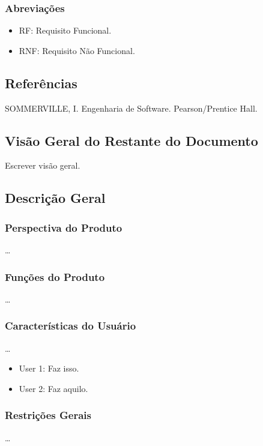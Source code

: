	\subsubsection{Abreviações}
	\begin{itemize}
	\item[] RF: Requisito Funcional.
	\item[] RNF: Requisito Não Funcional.
	\end{itemize}



\subsection{Referências}
SOMMERVILLE, I. Engenharia de Software. Pearson/Prentice Hall.



\subsection{Visão Geral do Restante do Documento}
Escrever visão geral.



\subsection{Descrição Geral}

	\subsubsection{Perspectiva do Produto}
	\ldots
	
	\subsubsection{Funções do Produto}
	\ldots
	
	\subsubsection{Características do Usuário}
	\ldots
	\begin{itemize}
	\item[] User 1: Faz isso.
	\item[] User 2: Faz aquilo.
	\end{itemize}

	\subsubsection{Restrições Gerais}
	\ldots
	
